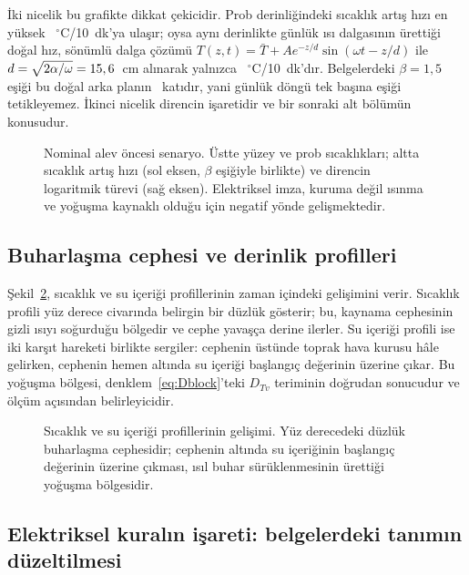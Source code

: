 \documentclass[11pt,a4paper]{article}
\begin{document}
İki nicelik bu grafikte dikkat çekicidir. Prob derinliğindeki sıcaklık artış
hızı en yüksek \maxdTdt~$^\circ$C/10~dk'ya ulaşır; oysa aynı derinlikte günlük
ısı dalgasının ürettiği doğal hız, sönümlü dalga çözümü
$T(z,t) = \bar T + A e^{-z/d}\sin(\omega t - z/d)$ ile
$d = \sqrt{2\alpha/\omega} = 15,6$~cm alınarak yalnızca
\diurnalRate~$^\circ$C/10~dk'dır. Belgelerdeki $\beta = 1{,}5$ eşiği bu doğal
arka planın \betaMarginNat\ katıdır, yani günlük döngü tek başına eşiği
tetikleyemez. İkinci nicelik direncin işaretidir ve bir sonraki alt bölümün
konusudur.

\begin{figure}[htbp]\centering

\caption{Nominal alev öncesi senaryo. Üstte yüzey ve prob sıcaklıkları; altta
sıcaklık artış hızı (sol eksen, $\beta$ eşiğiyle birlikte) ve direncin
logaritmik türevi (sağ eksen). Elektriksel imza, kuruma değil ısınma ve
yoğuşma kaynaklı olduğu için negatif yönde gelişmektedir.}
\label{fig:nominal}
\end{figure}

\subsection{Buharlaşma cephesi ve derinlik profilleri}

Şekil~\ref{fig:profile}, sıcaklık ve su içeriği profillerinin zaman içindeki
gelişimini verir. Sıcaklık profili yüz derece civarında belirgin bir düzlük
gösterir; bu, kaynama cephesinin gizli ısıyı soğurduğu bölgedir ve cephe
yavaşça derine ilerler. Su içeriği profili ise iki karşıt hareketi birlikte
sergiler: cephenin üstünde toprak hava kurusu hâle gelirken, cephenin hemen
altında su içeriği başlangıç değerinin üzerine çıkar. Bu yoğuşma bölgesi,
denklem~\eqref{eq:Dblock}'teki $D_{Tv}$ teriminin doğrudan sonucudur ve
ölçüm açısından belirleyicidir.

\begin{figure}[htbp]\centering

\caption{Sıcaklık ve su içeriği profillerinin gelişimi. Yüz derecedeki düzlük
buharlaşma cephesidir; cephenin altında su içeriğinin başlangıç değerinin
üzerine çıkması, ısıl buhar sürüklenmesinin ürettiği yoğuşma bölgesidir.}
\label{fig:profile}
\end{figure}

\subsection{Elektriksel kuralın işareti: belgelerdeki tanımın düzeltilmesi}
\label{sec:sign}
\end{document}
